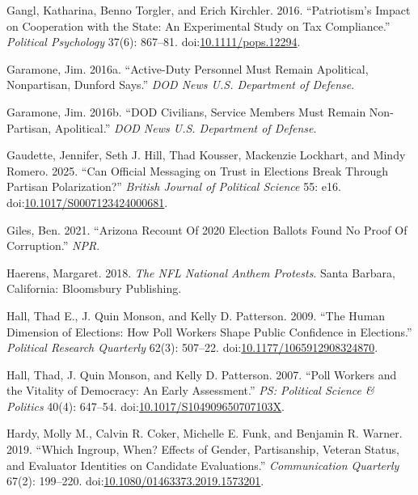 \documentclass[
  12pt,
  letterpaper,
]{article}
\newlength{\cslhangindent}
\newenvironment{CSLReferences}[2] %
 {\begin{list}{}{%
  \setlength{\itemindent}{0pt}
  \setlength{\leftmargin}{0pt}
  \setlength{\parsep}{0pt}
  \ifodd #1
   \setlength{\leftmargin}{\cslhangindent}
   \setlength{\itemindent}{-1\cslhangindent}
  \fi
  \setlength{\itemsep}{#2\baselineskip}}}
 {\end{list}}
\begin{document}
\begin{CSLReferences}{1}{1}
Gangl, Katharina, Benno Torgler, and Erich Kirchler. 2016.
{``Patriotism's {Impact} on {Cooperation} with the {State}: {An
Experimental Study} on {Tax Compliance}.''} \emph{Political Psychology}
37(6): 867--81.
doi:\href{https://doi.org/10.1111/pops.12294}{10.1111/pops.12294}.

Garamone, Jim. 2016a. {``Active-{Duty Personnel Must Remain Apolitical},
{Nonpartisan}, {Dunford Says}.''} \emph{DOD News {\textbar} U.S.
Department of Defense}.

Garamone, Jim. 2016b. {``{DOD} Civilians, Service Members Must Remain
Non-Partisan, Apolitical.''} \emph{DOD News {\textbar} U.S. Department
of Defense}.

Gaudette, Jennifer, Seth J. Hill, Thad Kousser, Mackenzie Lockhart, and
Mindy Romero. 2025. {``Can {Official Messaging} on {Trust} in {Elections
Break Through Partisan Polarization}?''} \emph{British Journal of
Political Science} 55: e16.
doi:\href{https://doi.org/10.1017/S0007123424000681}{10.1017/S0007123424000681}.

Giles, Ben. 2021. {``Arizona {Recount Of} 2020 {Election Ballots Found
No Proof Of Corruption}.''} \emph{NPR}.

Haerens, Margaret. 2018. \emph{The {NFL National Anthem Protests}}.
Santa Barbara, California: Bloomsbury Publishing.

Hall, Thad E., J. Quin Monson, and Kelly D. Patterson. 2009. {``The
{Human Dimension} of {Elections}: {How Poll Workers Shape Public
Confidence} in {Elections}.''} \emph{Political Research Quarterly}
62(3): 507--22.
doi:\href{https://doi.org/10.1177/1065912908324870}{10.1177/1065912908324870}.

Hall, Thad, J. Quin Monson, and Kelly D. Patterson. 2007. {``Poll
{Workers} and the {Vitality} of {Democracy}: {An Early Assessment}.''}
\emph{PS: Political Science \& Politics} 40(4): 647--54.
doi:\href{https://doi.org/10.1017/S104909650707103X}{10.1017/S104909650707103X}.

Hardy, Molly M., Calvin R. Coker, Michelle E. Funk, and Benjamin R.
Warner. 2019. {``Which Ingroup, When? {Effects} of Gender, Partisanship,
Veteran Status, and Evaluator Identities on Candidate Evaluations.''}
\emph{Communication Quarterly} 67(2): 199--220.
doi:\href{https://doi.org/10.1080/01463373.2019.1573201}{10.1080/01463373.2019.1573201}.


\end{CSLReferences}
\end{document}
